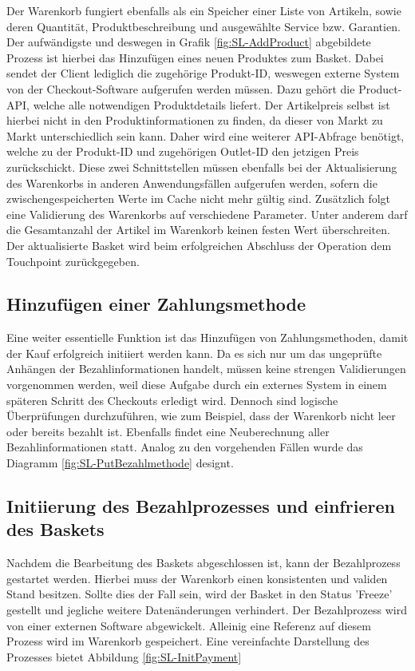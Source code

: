 Der Warenkorb fungiert ebenfalls als ein Speicher einer Liste von Artikeln, sowie deren Quantität, Produktbeschreibung und ausgewählte Service bzw. Garantien. Der aufwändigste und deswegen in Grafik \ref{fig:SL-AddProduct} abgebildete Prozess ist hierbei das Hinzufügen eines neuen Produktes zum Basket. Dabei sendet der Client lediglich die zugehörige Produkt-ID, weswegen externe System von der Checkout-Software aufgerufen werden müssen. Dazu gehört die Product-API, welche alle notwendigen Produktdetails liefert. Der Artikelpreis selbst ist hierbei nicht in den Produktinformationen zu finden, da dieser von Markt zu Markt unterschiedlich sein kann. Daher wird eine weiterer API-Abfrage benötigt, welche zu der Produkt-ID und zugehörigen Outlet-ID den jetzigen Preis zurückschickt. Diese zwei Schnittstellen müssen ebenfalls bei der Aktualisierung des Warenkorbs in anderen Anwendungsfällen aufgerufen werden, sofern die zwischengespeicherten Werte im Cache nicht mehr gültig sind. Zusätzlich folgt eine Validierung des Warenkorbs auf verschiedene Parameter. Unter anderem darf die Gesamtanzahl der Artikel im Warenkorb keinen festen Wert überschreiten. Der aktualisierte Basket wird beim erfolgreichen Abschluss der Operation dem Touchpoint zurückgegeben.

\subsection{Hinzufügen einer Zahlungsmethode}

Eine weiter essentielle Funktion ist das Hinzufügen von Zahlungsmethoden, damit der Kauf erfolgreich initiiert werden kann. Da es sich nur um das ungeprüfte Anhängen der Bezahlinformationen handelt, müssen keine strengen Validierungen vorgenommen werden, weil diese Aufgabe durch ein externes System in einem späteren Schritt des Checkouts erledigt wird. Dennoch sind logische Überprüfungen durchzuführen, wie zum Beispiel, dass der Warenkorb nicht leer oder bereits bezahlt ist. Ebenfalls findet eine Neuberechnung aller Bezahlinformationen statt. Analog zu den vorgehenden Fällen wurde das Diagramm \ref{fig:SL-PutBezahlmethode} designt.

\subsection{Initiierung des Bezahlprozesses und einfrieren des Baskets}

Nachdem die Bearbeitung des Baskets abgeschlossen ist, kann der Bezahlprozess gestartet werden. Hierbei muss der Warenkorb einen konsistenten und validen Stand besitzen. Sollte dies der Fall sein, wird der Basket in den Status 'Freeze' gestellt und jegliche weitere Datenänderungen verhindert. Der Bezahlprozess wird von einer externen Software abgewickelt. Alleinig eine Referenz auf diesem Prozess wird im Warenkorb gespeichert. Eine vereinfachte Darstellung des Prozesses bietet Abbildung \ref{fig:SL-InitPayment}

